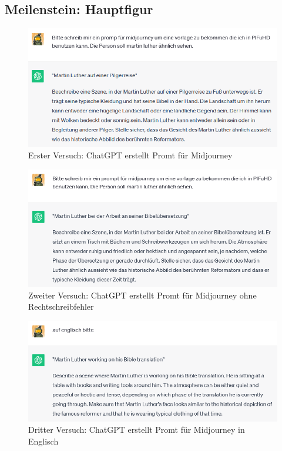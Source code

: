 \documentclass[12pt,a4paper,bibliography=totocnumbered,listof=totocnumbered]{scrartcl}
\begin{document}
\subsection {Meilenstein: Hauptfigur}
\begin{figure}[h]
	\centering
	\includegraphics[scale=0.7]{BilderFuerBA/CGPTMidJourneyMartinLuther/01.png}
	\caption{Erster Versuch: ChatGPT erstellt Promt für Midjourney}
	\label{fig:chatgpt-ptompt-Midjourney-01}
\end{figure}
\begin{figure}[h]
	\centering
	\includegraphics[scale=0.7]{BilderFuerBA/CGPTMidJourneyMartinLuther/02.png}
	\caption{Zweiter Versuch: ChatGPT erstellt Promt für Midjourney ohne Rechtschreibfehler}
	\label{fig:chatgpt-ptompt-Midjourney-02}
\end{figure}
\begin{figure}[h]
	\centering
	\includegraphics[scale=0.7]{BilderFuerBA/CGPTMidJourneyMartinLuther/03.png}
	\caption{Dritter Versuch: ChatGPT erstellt Promt für Midjourney in Englisch}
	\label{fig:chatgpt-ptompt-Midjourney-03}
\end{figure}
\end{document}
